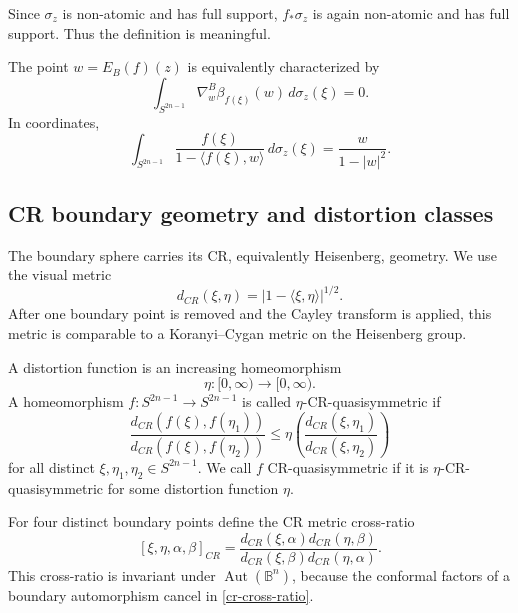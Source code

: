 \documentclass[11pt]{article}
\theoremstyle{definition}
\theoremstyle{remark}
\theoremstyle{definition}
\newcommand{\B}{\mathbb B}
\newcommand{\Aut}{\operatorname{Aut}}
\begin{document}
Since \(\sigma_z\) is non-atomic and has full support, \(f_*\sigma_z\) is again
non-atomic and has full support.  Thus the definition is meaningful.

The point \(w=E_B(f)(z)\) is equivalently characterized by
\begin{equation}\label{extension-euler}
        \int_{S^{2n-1}}\nabla_w^B\beta_{f(\xi)}(w)\,d\sigma_z(\xi)=0.
\end{equation}
In coordinates,
\begin{equation}\label{extension-coordinate-euler}
        \int_{S^{2n-1}}
        \frac{f(\xi)}{1-\langle f(\xi),w\rangle}\,d\sigma_z(\xi)
        =
        \frac{w}{1-|w|^2}.
\end{equation}


\subsection{CR boundary geometry and distortion classes}
\label{section-small-distortion}

The boundary sphere carries its CR, equivalently Heisenberg, geometry.  We use
the visual metric
\begin{equation}\label{cr-visual-metric}
        d_{CR}(\xi,\eta)=|1-\langle \xi,\eta\rangle|^{1/2}.
\end{equation}
After one boundary point is removed and the Cayley transform is applied, this
metric is comparable to a Koranyi--Cygan metric on the Heisenberg group.

A distortion function is an increasing homeomorphism
\[
        \eta:[0,\infty)\to[0,\infty).
\]
A homeomorphism \(f:S^{2n-1}\to S^{2n-1}\) is called
\(\eta\)-CR-quasisymmetric if
\[
        \frac{d_{CR}(f(\xi),f(\eta_1))}
             {d_{CR}(f(\xi),f(\eta_2))}
        \le
        \eta\left(
        \frac{d_{CR}(\xi,\eta_1)}
             {d_{CR}(\xi,\eta_2)}
        \right)
\]
for all distinct \(\xi,\eta_1,\eta_2\in S^{2n-1}\).  We call \(f\)
CR-quasisymmetric if it is \(\eta\)-CR-quasisymmetric for some distortion
function \(\eta\).

For four distinct boundary points define the CR metric cross-ratio
\begin{equation}\label{cr-cross-ratio}
        [\xi,\eta,\alpha,\beta]_{CR}
        =
        \frac{d_{CR}(\xi,\alpha)d_{CR}(\eta,\beta)}
        {d_{CR}(\xi,\beta)d_{CR}(\eta,\alpha)}.
\end{equation}
This cross-ratio is invariant under \(\Aut(\B^n)\), because the conformal
factors of a boundary automorphism cancel in \eqref{cr-cross-ratio}.
\end{document}
